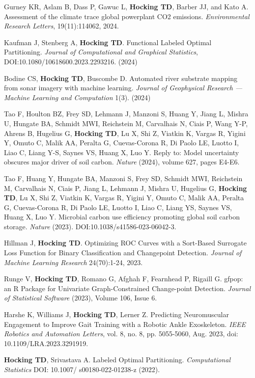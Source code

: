 \documentclass[margin,line]{res}
\begin{document}
\begin{resume}
Gurney KR, Aslam B, Dass P, Gawuc L, {\bf Hocking TD}, Barber JJ, and Kato A. Assessment of the climate trace global powerplant CO2 emissions. {\it Environmental Research Letters}, 19(11):114062, 2024.

Kaufman J, Stenberg A, {\bf Hocking TD}. Functional Labeled Optimal
Partitioning. {\it Journal of Computational and Graphical Statistics},
DOI:10.1080/10618600.2023.2293216. (2024)

Bodine CS, {\bf Hocking TD}, Buscombe D. Automated river substrate
mapping from sonar imagery with machine learning.  {\it
  Journal of Geophysical Research --- Machine Learning and
  Computation} 1(3). (2024)

Tao F, Houlton BZ, Frey SD, Lehmann J, Manzoni S, Huang Y, Jiang L,
Mishra U, Hungate BA, Schmidt MWI, Reichstein M, Carvalhais N, Ciais
P, Wang Y-P, Ahrens B, Hugelius G, {\bf Hocking TD}, Lu X, Shi Z, Viatkin K,
Vargas R, Yigini Y, Omuto C, Malik AA, Peralta G, Cuevas-Corona R, Di
Paolo LE, Luotto I, Liao C, Liang Y-S, Saynes VS, Huang X, Luo
Y. Reply to: Model uncertainty obscures major driver of soil
carbon. {\it Nature} (2024), volume 627, pages E4-E6.

Tao F, Huang Y, Hungate BA, Manzoni S, Frey SD, Schmidt MWI,
Reichstein M, Carvalhais N, Ciais P, Jiang L, Lehmann J, Mishra U,
Hugelius G, {\bf Hocking TD}, Lu X, Shi Z, Viatkin K, Vargas R, Yigini
Y, Omuto C, Malik AA, Peralta G, Cuevas-Corona R, Di Paolo LE, Luotto
I, Liao C, Liang YS, Saynes VS, Huang X, Luo Y. Microbial carbon use
efficiency promoting global soil carbon storage. {\it Nature} (2023).
DOI:10.1038/s41586-023-06042-3.

Hillman J, {\bf Hocking TD}. Optimizing ROC Curves with a Sort-Based
Surrogate Loss Function for Binary Classification and Changepoint
Detection. {\it Journal of Machine Learning Research} 24(70):1-24, 2023.

Runge V, {\bf Hocking TD}, Romano G, Afghah F, Fearnhead P, Rigaill
G. gfpop: an R Package for Univariate Graph-Constrained Change-point
Detection. {\it Journal of Statistical Software} (2023), Volume 106,
Issue 6.

Harshe K, Williams J, {\bf Hocking TD}, Lerner Z. Predicting Neuromuscular
Engagement to Improve Gait Training with a Robotic Ankle
Exoskeleton. {\it IEEE Robotics and Automation Letters}, vol. 8,
no. 8, pp. 5055-5060, Aug. 2023, doi: 10.1109/LRA.2023.3291919.

{\bf Hocking TD}, Srivastava A. Labeled Optimal Partitioning. {\it
  Computational Statistics} DOI: 10.1007/ s00180-022-01238-z (2022).


\end{resume}
\end{document}
